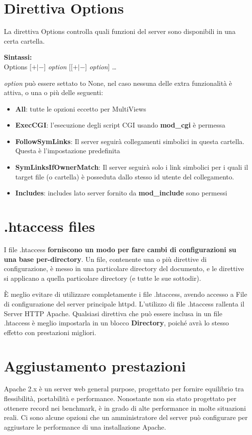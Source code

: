 \section{Direttiva Options}
La direttiva Options controlla quali funzioni del server sono disponibili in una certa cartella. \\
\begin{center}
    \textbf{Sintassi:}\\
    Options [$+ | -$] \emph{option} [[$+ | -$] \emph{option}] \dots
\end{center}
\emph{option} può essere settato to None, nel caso nessuna delle extra funzionalità è attiva, o una o più delle seguenti:
\begin{itemize}
    \item \textbf{All}: tutte le opzioni eccetto per MultiViews
    \item \textbf{ExecCGI}: l'esecuzione degli script CGI usando \textbf{mod\_cgi} è permessa
    \item \textbf{FollowSymLinks}: Il server seguirà collegamenti simbolici in questa cartella. Questa è l'impostazione predefinita
    \item \textbf{SymLinksIfOwnerMatch}: Il server seguirà solo i link simbolici per i quali il target file (o cartella) è posseduta dallo stesso id utente del collegamento. 
    \item \textbf{Includes}: includes lato server fornito da \textbf{mod\_include} sono permessi
\end{itemize}

\section{.htaccess files}
I file .htaccess \textbf{forniscono un modo per fare cambi di configurazioni su una base per-directory}. 
Un file, contenente una o più direttive di configurazione, è messo in una particolare directory del documento, e le direttive si applicano a quella particolare directory (e tutte le sue sottodir).

È meglio evitare di utilizzare completamente i file .htaccess, avendo accesso a
File di configurazione del server principale httpd. L'utilizzo di file .htaccess rallenta il
Server HTTP Apache. Qualsiasi direttiva che può essere inclusa in un file .htaccess è meglio impostarla in un blocco \textbf{Directory}, poiché avrà lo stesso effetto
con prestazioni migliori.

\section{Aggiustamento prestazioni}
Apache 2.x è un server web general purpose, progettato per fornire equilibrio tra flessibilità, portabilità e performance. Nonostante non sia stato progettato per ottenere record nei benchmark, è in grado di alte performance in molte situazioni reali. Ci sono alcune opzioni che un amministratore del server può configurare per aggiustare le performance di una installazione Apache.

